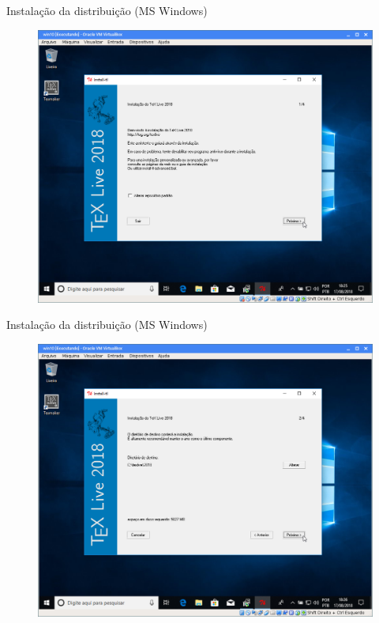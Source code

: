 \documentclass{beamer}
\begin{document}

\begin{frame}{Instala\c{c}\~ao da distribui\c{c}\~ao (MS Windows)}
    \begin{figure}[h]
        \includegraphics[scale=0.25]{fig/texlive-04.png}
    \end{figure}
\end{frame}

\begin{frame}{Instala\c{c}\~ao da distribui\c{c}\~ao (MS Windows)}
    \begin{figure}[h]
        \includegraphics[scale=0.25]{fig/texlive-05.png}
    \end{figure}
\end{frame}
\end{document}

